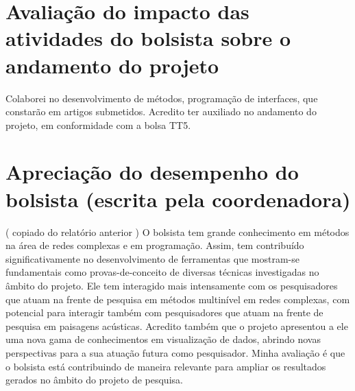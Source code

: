 \documentclass[a4paper, 11pt]{article}
\begin{document}
\section{Avaliação do impacto das atividades do bolsista sobre o andamento do projeto}
Colaborei no desenvolvimento de métodos, programação de interfaces,
que constarão em artigos submetidos.
Acredito ter auxiliado no andamento do projeto, em conformidade com a bolsa TT5.

\section{Apreciação do desempenho do bolsista (escrita pela coordenadora)}
( copiado do relatório anterior )
O bolsista tem grande conhecimento em métodos na área de redes complexas e em programação. Assim, tem contribuído significativamente no desenvolvimento de ferramentas que mostram-se fundamentais como provas-de-conceito de diversas técnicas investigadas no âmbito do projeto. Ele tem interagido mais intensamente com os pesquisadores que atuam na frente de pesquisa em métodos multinível em redes complexas, com potencial para interagir também com pesquisadores que atuam na frente de pesquisa em paisagens acústicas. Acredito também que o projeto apresentou a ele uma nova gama de conhecimentos em visualização de dados, abrindo novas perspectivas para a sua atuação futura como pesquisador. Minha avaliação é que o bolsista está contribuindo de maneira relevante para ampliar os resultados gerados no âmbito do projeto de pesquisa.


\end{document}

